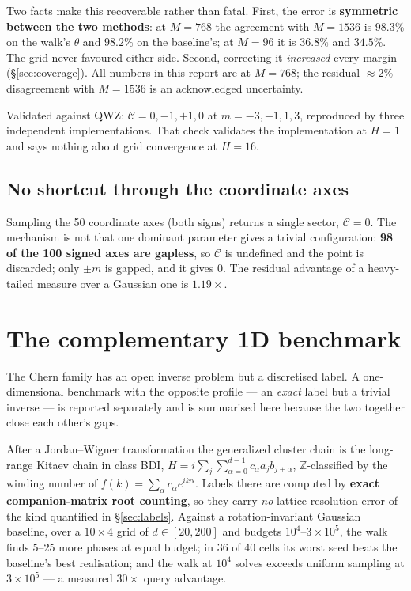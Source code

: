 \documentclass[11pt]{article}
\newcommand{\good}[1]{\textcolor{blue!70!black}{\textbf{#1}}}
\begin{document}
Two facts make this recoverable rather than fatal. First, the error is
\good{symmetric between the two methods}: at $M=768$ the agreement with
$M=1536$ is $98.3\%$ on the walk's $\theta$ and $98.2\%$ on the baseline's; at
$M=96$ it is $36.8\%$ and $34.5\%$. The grid never favoured either side.
Second, correcting it \emph{increased} every margin (\S\ref{sec:coverage}).
All numbers in this report are at $M=768$; the residual $\approx2\%$
disagreement with $M=1536$ is an acknowledged uncertainty.

Validated against QWZ: $\mathcal{C}=0,-1,+1,0$ at $m=-3,-1,1,3$, reproduced by
three independent implementations. That check validates the implementation at
$H=1$ and says nothing about grid convergence at $H=16$.

\subsection{No shortcut through the coordinate axes}

Sampling the 50 coordinate axes (both signs) returns a single sector,
$\mathcal{C}=0$. The mechanism is not that one dominant parameter gives a
trivial configuration: \good{98 of the 100 signed axes are gapless}, so
$\mathcal{C}$ is undefined and the point is discarded; only $\pm m$ is gapped,
and it gives $0$. The residual advantage of a heavy-tailed measure over a
Gaussian one is $1.19\times$.

\section{The complementary 1D benchmark}
\label{sec:bdi}

The Chern family has an open inverse problem but a discretised label. A
one-dimensional benchmark with the opposite profile --- an \emph{exact} label
but a trivial inverse --- is reported separately \cite{spt2026} and is
summarised here because the two together close each other's gaps.

After a Jordan--Wigner transformation the generalized cluster chain is the
long-range Kitaev chain in class BDI,
$H=i\sum_j\sum_{\alpha=0}^{d-1}c_\alpha a_j b_{j+\alpha}$, $\mathbb{Z}$-classified
by the winding number of $f(k)=\sum_\alpha c_\alpha e^{ik\alpha}$. Labels there
are computed by \good{exact companion-matrix root counting}, so they carry
\emph{no} lattice-resolution error of the kind quantified in
\S\ref{sec:labels}. Against a rotation-invariant Gaussian baseline, over a
$10\times4$ grid of $d\in[20,200]$ and budgets $10^4$--$3\times10^5$, the walk
finds $5$--$25$ more phases at equal budget; in 36 of 40 cells its worst seed
beats the baseline's best realisation; and the walk at $10^4$ solves exceeds
uniform sampling at $3\times10^5$ --- a measured $30\times$ query advantage.
\end{document}
